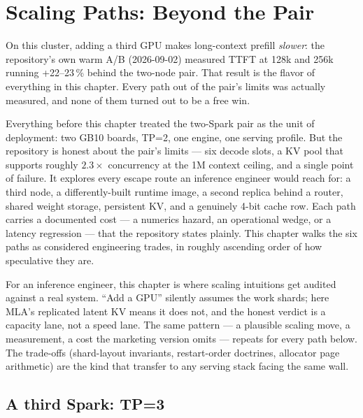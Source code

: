 
\chapter{Scaling Paths: Beyond the Pair}
\label{ch:scaling}

On this cluster, adding a third GPU makes long-context prefill
\emph{slower}: the repository's own warm A/B (2026-09-02) measured TTFT at 128k
and 256k running +22--23\,\% behind the two-node pair. That result is the
flavor of everything in this chapter. Every path out of the pair's limits
was actually measured, and none of them turned out to be a free win.

Everything before this chapter treated the two-Spark pair as the unit of
deployment: two GB10 boards, TP=2, one engine, one serving profile. But the
repository is honest about the pair's limits --- six decode slots, a KV pool
that supports roughly $2.3\times$ concurrency at the 1M context ceiling, and a
single point of failure. It explores every escape route an inference
engineer would reach for: a third node, a differently-built runtime image, a
second replica behind a router, shared weight storage, persistent KV, and a
genuinely 4-bit cache row. Each path carries a documented cost --- a
numerics hazard, an operational wedge, or a latency regression --- that the
repository states plainly. This chapter walks the six paths as considered
engineering trades, in roughly ascending order of how speculative they are.

For an inference engineer, this chapter is where scaling intuitions get
audited against a real system. ``Add a GPU'' silently assumes the work
shards; here MLA's replicated latent KV means it does not, and the honest
verdict is a capacity lane, not a speed lane. The same pattern --- a
plausible scaling move, a measurement, a cost the marketing version omits
--- repeats for every path below. The trade-offs (shard-layout
invariants, restart-order doctrines, allocator page arithmetic) are the
kind that transfer to any serving stack facing the same wall.

\section{A third Spark: TP=3}

